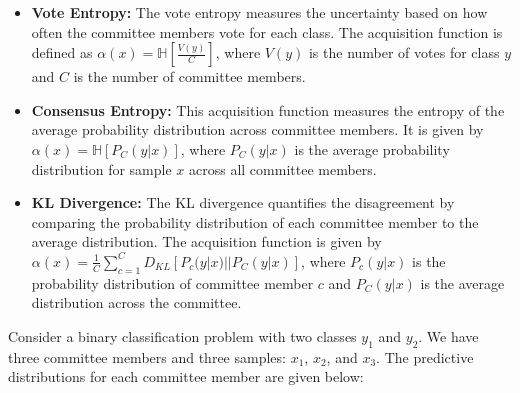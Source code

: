 \documentclass[
  letterpaper,
  numbers=noenddot,
  DIV=11]{scrreprt}
\theoremstyle{definition}
\theoremstyle{plain}
\theoremstyle{plain}
\theoremstyle{remark}
\begin{document}
\begin{itemize}
\item
  \textbf{Vote Entropy:} The vote entropy measures the uncertainty based
  on how often the committee members vote for each class. The
  acquisition function is defined as
  \(\alpha(x) = \mathbb{H}\left[\frac{V(y)}{C}\right]\), where \(V(y)\)
  is the number of votes for class \(y\) and \(C\) is the number of
  committee members.
\item
  \textbf{Consensus Entropy:} This acquisition function measures the
  entropy of the average probability distribution across committee
  members. It is given by \(\alpha(x) = \mathbb{H}[P_C(y|x)]\), where
  \(P_C(y|x)\) is the average probability distribution for sample \(x\)
  across all committee members.
\item
  \textbf{KL Divergence:} The KL divergence quantifies the disagreement
  by comparing the probability distribution of each committee member to
  the average distribution. The acquisition function is given by
  \(\alpha(x) = \frac{1}{C} \sum_{c=1}^{C} D_{KL}[P_c(y|x) || P_C(y|x)]\),
  where \(P_c(y|x)\) is the probability distribution of committee member
  \(c\) and \(P_C(y|x)\) is the average distribution across the
  committee.
\end{itemize}

Consider a binary classification problem with two classes \(y_1\) and
\(y_2\). We have three committee members and three samples: \(x_1\),
\(x_2\), and \(x_3\). The predictive distributions for each committee
member are given below:
\end{document}
